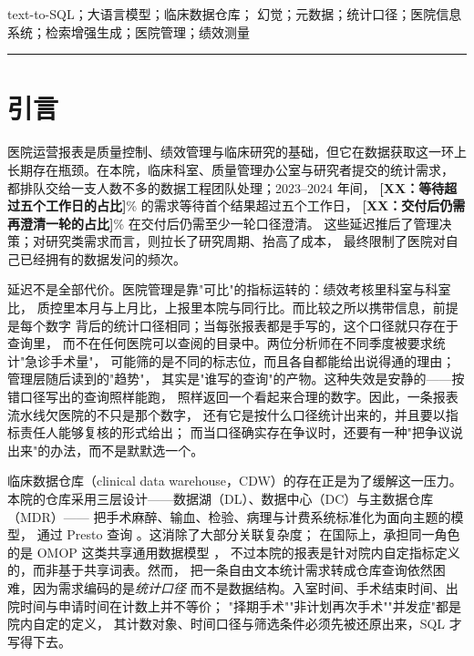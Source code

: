 \documentclass[11pt,a4paper]{article}
\newcommand{\PH}[1]{{\color{red}\textbf{[#1]}}}
\begin{document}
\vspace{6pt}
\quad text-to-SQL；大语言模型；临床数据仓库；
幻觉；元数据；统计口径；医院信息系统；检索增强生成；医院管理；绩效测量

\vspace{4pt}

\vspace{10pt}
\hrule
\vspace{10pt}

\section{引言}
医院运营报表是质量控制、绩效管理与临床研究的基础，但它在数据获取这一环上
长期存在瓶颈。在本院，临床科室、质量管理办公室与研究者提交的统计需求，
都排队交给一支人数不多的数据工程团队处理；2023--2024 年间，
\PH{XX：等待超过五个工作日的占比}\% 的需求等待首个结果超过五个工作日，
\PH{XX：交付后仍需再澄清一轮的占比}\% 在交付后仍需至少一轮口径澄清。
这些延迟推后了管理决策；对研究类需求而言，则拉长了研究周期、抬高了成本，
最终限制了医院对自己已经拥有的数据发问的频次。

延迟不是全部代价。医院管理是靠"可比"的指标运转的：绩效考核里科室与科室比，
质控里本月与上月比，上报里本院与同行比。而比较之所以携带信息，前提是每个数字
背后的统计口径相同；当每张报表都是手写的，这个口径就只存在于查询里，
而不在任何医院可以查阅的目录中。两位分析师在不同季度被要求统计"急诊手术量"，
可能筛的是不同的标志位，而且各自都能给出说得通的理由；管理层随后读到的"趋势"，
其实是"谁写的查询"的产物。这种失效是安静的——按错口径写出的查询照样能跑，
照样返回一个看起来合理的数字。因此，一条报表流水线欠医院的不只是那个数字，
还有它是按什么口径统计出来的，并且要以指标责任人能够复核的形式给出；
而当口径确实存在争议时，还要有一种"把争议说出来"的办法，而不是默默选一个。

临床数据仓库（clinical data warehouse，CDW）的存在正是为了缓解这一压力。
本院的仓库采用三层设计——数据湖（DL）、数据中心（DC）与主数据仓库（MDR）——
把手术麻醉、输血、检验、病理与计费系统标准化为面向主题的模型，
通过 Presto 查询 \cite{presto2019}。这消除了大部分关联复杂度；
在国际上，承担同一角色的是 OMOP 这类共享通用数据模型 \cite{ohdsi2015}，
不过本院的报表是针对院内自定指标定义的，而非基于共享词表。然而，
把一条自由文本统计需求转成仓库查询依然困难，因为需求编码的是\emph{统计口径}
而不是数据结构。入室时间、手术结束时间、出院时间与申请时间在计数上并不等价；
"择期手术""非计划再次手术""并发症"都是院内自定的定义，
其计数对象、时间口径与筛选条件必须先被还原出来，SQL 才写得下去。
\end{document}
